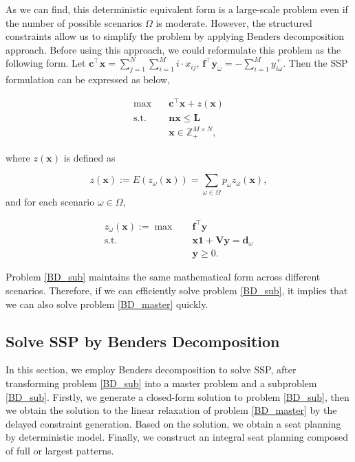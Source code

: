 As we can find, this deterministic equivalent form is a large-scale problem even if the number of possible scenarios $\Omega$ is moderate. However, the structured constraints allow us to simplify the problem by applying Benders decomposition approach. Before using this approach, we could reformulate this problem as the following form. Let $\mathbf{c}^{\intercal}\mathbf{x} = \sum_{j =1}^{N} \sum_{i=1}^M i \cdot x_{ij}$, $\mathbf{f}^{\intercal}\mathbf{y}_{\omega} = -\sum_{i=1}^{M} y_{i \omega}^{+}$. Then the SSP formulation can be expressed as below,

\begin{equation}\label{BD_master}
\begin{aligned}
\max \quad & \mathbf{c}^{\intercal} \mathbf{x}+ z(\mathbf{x}) \\
\text {s.t.} \quad & \mathbf{n} \mathbf{x} \leq \mathbf{L} \\
& \mathbf{x} \in \mathbb{Z}_{+}^{M \times N},
\end{aligned}
\end{equation}

where $z(\mathbf{x})$ is defined as 

$$z(\mathbf{x}) := E(z_{\omega}(\mathbf{x})) = \sum_{\omega \in \Omega} p_{\omega} z_{\omega}(\mathbf{x}),$$ and for each scenario $\omega \in \Omega$, 

\begin{equation}\label{BD_sub}
  \begin{aligned}
    z_{\omega}(\mathbf{x}) := \max \quad & \mathbf{f}^{\intercal} \mathbf{y} \\
    \text {s.t.} \quad & \mathbf{x} \mathbf{1} + \mathbf{V} \mathbf{y} = \mathbf{d}_{\omega} \\
     & \mathbf{y} \geq 0.
  \end{aligned}
\end{equation}


Problem \eqref{BD_sub} maintains the same mathematical form across different scenarios. Therefore, if we can efficiently solve problem \eqref{BD_sub}, it implies that we can also solve problem \eqref{BD_master} quickly.

\subsection{Solve SSP by Benders Decomposition}\label{solve_by_benders}
In this section, we employ Benders decomposition to solve SSP, after transforming problem \eqref{BD_sub} into a master problem and a subproblem \eqref{BD_sub}. Firstly, we generate a closed-form solution to problem \eqref{BD_sub}, then we obtain the solution to the linear relaxation of problem \eqref{BD_master} by the delayed constraint generation. Based on the solution, we obtain a seat planning by deterministic model. Finally, we construct an integral seat planning composed of full or largest patterns.

